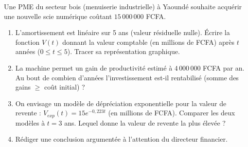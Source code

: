 \documentclass[11pt]{article}
\begin{document}
\begin{exercice}
Une PME du secteur bois (menuiserie industrielle) à Yaoundé souhaite acquérir une nouvelle scie numérique coûtant $15\,000\,000$ FCFA.
\begin{enumerate}
    \item L'amortissement est linéaire sur 5 ans (valeur résiduelle nulle). Écrire la fonction $V(t)$ donnant la valeur comptable (en millions de FCFA) après $t$ années ($0 \le t \le 5$). Tracer sa représentation graphique.
    \item La machine permet un gain de productivité estimé à $4\,000\,000$ FCFA par an. Au bout de combien d'années l'investissement est-il rentabilisé (somme des gains $\ge$ coût initial) ?
    \item On envisage un modèle de dépréciation exponentielle pour la valeur de revente : $V_{exp}(t) = 15 e^{-0,223 t}$ (en millions de FCFA). Comparer les deux modèles à $t=3$ ans. Lequel donne la valeur de revente la plus élevée ?
    \item Rédiger une conclusion argumentée à l'attention du directeur financier.
\end{enumerate}
\end{exercice}
\end{document}
